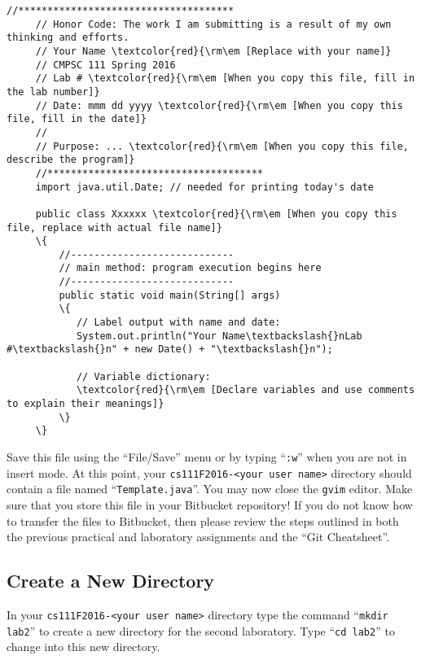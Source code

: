 \newpage
\begin{Verbatim}[commandchars=\\\{\}]
     //*************************************
     // Honor Code: The work I am submitting is a result of my own thinking and efforts.
     // Your Name \textcolor{red}{\rm\em [Replace with your name]}
     // CMPSC 111 Spring 2016
     // Lab # \textcolor{red}{\rm\em [When you copy this file, fill in the lab number]}
     // Date: mmm dd yyyy \textcolor{red}{\rm\em [When you copy this file, fill in the date]}
     //
     // Purpose: ... \textcolor{red}{\rm\em [When you copy this file, describe the program]}
     //*************************************
     import java.util.Date; // needed for printing today's date

     public class Xxxxxx \textcolor{red}{\rm\em [When you copy this file, replace with actual file name]}
     \{
         //----------------------------
         // main method: program execution begins here
         //----------------------------
         public static void main(String[] args)
         \{
            // Label output with name and date:
            System.out.println("Your Name\textbackslash{}nLab #\textbackslash{}n" + new Date() + "\textbackslash{}n");

            // Variable dictionary:
            \textcolor{red}{\rm\em [Declare variables and use comments to explain their meanings]}
         \}
     \}
\end{Verbatim}

\vspace*{-.1in}

\noindent Save this file using the ``File/Save'' menu or by typing ``{\tt :w}'' when you are not in insert mode. At this
point, your {\tt cs111F2016-<your user name>} directory should contain a file named ``{\tt Template.java}''. You may now
close the {\tt gvim} editor. Make sure that you store this file in your Bitbucket repository! If you do not know how to
transfer the files to Bitbucket, then please review the steps outlined in both the previous practical and laboratory
assignments and the ``Git Cheatsheet''.

\vspace*{-.1in}
\subsection*{Create a New Directory}

In your {\tt cs111F2016-<your user name>} directory type the command ``{\tt mkdir lab2}'' to create a new directory for
the second laboratory.
\noindent Type ``{\tt cd lab2}'' to change into this new directory.

